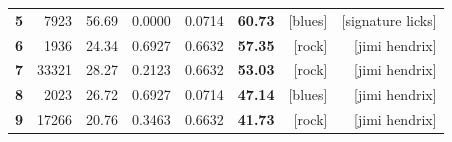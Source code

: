 \documentclass{article}
\begin{document}
\begin{table}[!htbp]
\begin{tabular}{rr|rrrr|rr|}
        \textbf{5}           & 7923                  & 56.69                                 & 0.0000                                   & 0.0714                              & \textbf{60.73}       & {[}blues{]}                         & {[}signature licks{]} \\
        \textbf{6}           & 1936                  & 24.34                                 & 0.6927                                   & 0.6632                              & \textbf{57.35}       & {[}rock{]}                          & {[}jimi hendrix{]}    \\
        \textbf{7}           & 33321                 & 28.27                                 & 0.2123                                   & 0.6632                              & \textbf{53.03}       & {[}rock{]}                          & {[}jimi hendrix{]}    \\
        \textbf{8}           & 2023                  & 26.72                                 & 0.6927                                   & 0.0714                              & \textbf{47.14}       & {[}blues{]}                         & {[}jimi hendrix{]}    \\
        \textbf{9}           & 17266                 & 20.76                                 & 0.3463                                   & 0.6632                              & \textbf{41.73}       & {[}rock{]}                          & {[}jimi hendrix{]}    \\ \hline
    \end{tabular}
\end{table}
% 
\end{document}
